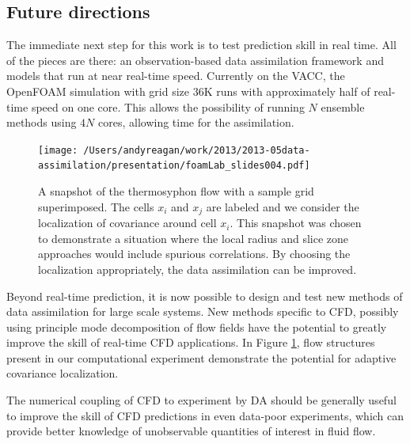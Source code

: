 \documentclass[12pt]{report}
\begin{document}
\subsection{Future directions}

The immediate next step for this work is to test prediction skill in real time.
All of the pieces are there: an observation-based data assimilation framework and models that run at near real-time speed.
Currently on the VACC, the OpenFOAM simulation with grid size 36K runs with approximately half of real-time speed on one core.
This allows the possibility of running $N$ ensemble methods using $4N$ cores, allowing time for the assimilation.

\begin{figure}[h!]
  \centering
  \texttt{[image: /Users/andyreagan/work/2013/2013-05data-assimilation/presentation/foamLab\_slides004.pdf]}
  \caption[A snapshot of the thermosyphon flow with a sample grid superimposed]{
    A snapshot of the thermosyphon flow with a sample grid superimposed.
    The cells $x_i$ and $x_j$ are labeled and we consider the localization of covariance around cell $x_i$.
    This snapshot was chosen to demonstrate a situation where the local radius and slice zone approaches would include spurious correlations.
    By choosing the localization appropriately, the data assimilation can be improved.
  }
  \label{fig:localcovadaptive}
\end{figure}

Beyond real-time prediction, it is now possible to design and test new methods of data assimilation for large scale systems.
New methods specific to CFD, possibly using principle mode decomposition of flow fields have the potential to greatly improve the skill of real-time CFD applications.
In Figure \ref{fig:localcovadaptive}, flow structures present in our computational experiment demonstrate the potential for adaptive covariance localization.

The numerical coupling of CFD to experiment by DA should be generally useful to improve the skill of CFD predictions in even data-poor experiments, which can provide better knowledge of unobservable quantities of interest in fluid flow.
\end{document}
